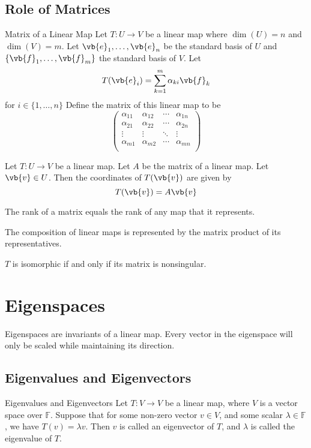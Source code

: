 \subsection{Role of Matrices}
\begin{defn}{Matrix of a Linear Map}{} Let $T:U\to V$ be a linear map where $\dim(U)=n$ and $\dim(V)=m$. Let $\vb{e}_1,\dots,\vb{e}_n$ be the standard basis of $U$ and $\{\vb{f}_1,\dots,\vb{f}_m\}$ the standard basis of $V$. Let $$T(\vb{e}_i)=\sum_{k=1}^m\alpha_{ki}\vb{f}_k$$ for $i\in\{1,\dots,n\}$ Define the matrix of this linear map to be $$\begin{pmatrix}
\alpha_{11} & \alpha_{12} & \cdots & \alpha_{1n}\\
\alpha_{21} & \alpha_{22} & \cdots & \alpha_{2n}\\
\vdots & \vdots & \ddots & \vdots\\
\alpha_{m1} & \alpha_{m2} & \cdots & \alpha_{mn}\\
\end{pmatrix}$$
\end{defn}

\begin{thm}{}{} Let $T:U\to V$ be a linear map. Let $A$ be the matrix of a linear map. Let $\vb{v}\in U$. Then the coordinates of $T(\vb{v})$ are given by $$T(\vb{v})=A\vb{v}$$
\end{thm}

\begin{thm}{}{} The rank of a matrix equals the rank of any map that it represents. 
\end{thm}

\begin{thm}{}{} The composition of linear maps is represented by the matrix product of its representatives. 
\end{thm}

\begin{thm}{}{} $T$ is isomorphic if and only if its matrix is nonsingular. 
\end{thm}

\pagebreak
\section{Eigenspaces}
Eigenspaces are invariants of a linear map. Every vector in the eigenspace will only be scaled while maintaining its direction. 
\subsection{Eigenvalues and Eigenvectors}
\begin{defn}{Eigenvalues and Eigenvectors}{} Let $T:V\to V$ be a linear map, where $V$ is a vector space over $\mathbb{F}$. Suppose that for some non-zero vector $v\in V$, and some scalar $\lambda\in\mathbb{F}$, we have $T(v)=\lambda v$. Then $v$ is called an eigenvector of $T$, and $\lambda$ is called the eigenvalue of $T$. 
\end{defn}


